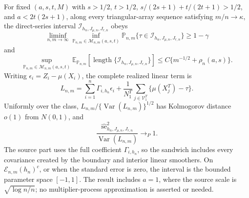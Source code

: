 For fixed \((a,s,t,M)\) with \(s>1/2\), \(t>1/2\), \(s/(2s+1)+t/(2t+1)>1/2\), and \(a<2t(2s+1)\), along every triangular-array sequence satisfying \(m/n\to\kappa\), the direct-series interval \(\mathcal I_{h_n,J_{\mu,n},J_{r,n}}\) obeys
\[
 \liminf_{n,m\to\infty}\inf_{\mathbb P_{n,m}\in\mathcal M_{n,m}(a,s,t)}
 \mathbb P_{n,m}\{\tau\in\mathcal I_{h_n,J_{\mu,n},J_{r,n}}\}\ge1-\gamma
\]
and
\[
 \sup_{\mathbb P_{n,m}\in\mathcal M_{n,m}(a,s,t)}
 \mathbb E_{\mathbb P_{n,m}}\!\left[\operatorname{length}
 \{\mathcal I_{h_n,J_{\mu,n},J_{r,n}}\}\right]
 \le C\{m^{-1/2}+\rho_n(a,s)\}.
\]
Writing \(\epsilon_i=Z_i-\mu(X_i)\), the complete realized linear term is
\[
 L_{n,m}=\sum_{i=1}^n\Gamma_{i,h_n}\epsilon_i
 +\frac1{N^T_1}\sum_{j\in\mathcal V^T_1}\{\mu(X_j^T)-\tau\}.
\]
Uniformly over the class, \(L_{n,m}/\{\operatorname{Var}(L_{n,m})\}^{1/2}\) has Kolmogorov distance \(o(1)\) from \(N(0,1)\), and
\[
 \frac{\widehat{\mathrm{se}}_{h_n,J_{\mu,n},J_{r,n}}^2}
 {\operatorname{Var}(L_{n,m})}\longrightarrow_P1.
\]
The source part uses the full coefficient \(\Gamma_{i,h_n}\), so the sandwich includes every covariance created by the boundary and interior linear smoothers.  On \(\mathcal E_{n,m}(h_n)^c\), or when the standard error is zero, the interval is the bounded parameter space \([-1,1]\).  The result includes \(a=1\), where the source scale is \(\sqrt{\log n/n}\); no multiplier-process approximation is asserted or needed.